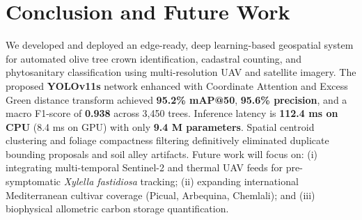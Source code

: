 \documentclass[5p,times]{elsarticle}
\begin{document}
\section{Conclusion and Future Work}
We developed and deployed an edge-ready, deep learning-based geospatial system for automated olive tree crown identification, cadastral counting, and phytosanitary classification using multi-resolution UAV and satellite imagery. The proposed \textbf{YOLOv11s} network enhanced with Coordinate Attention and Excess Green distance transform achieved \textbf{95.2\% mAP@50}, \textbf{95.6\% precision}, and a macro F1-score of \textbf{0.938} across 3,450 trees. Inference latency is \textbf{112.4 ms on CPU} (8.4 ms on GPU) with only \textbf{9.4 M parameters}. Spatial centroid clustering and foliage compactness filtering definitively eliminated duplicate bounding proposals and soil alley artifacts. Future work will focus on: (i) integrating multi-temporal Sentinel-2 and thermal UAV feeds for pre-symptomatic \textit{Xylella fastidiosa} tracking; (ii) expanding international Mediterranean cultivar coverage (Picual, Arbequina, Chemlali); and (iii) biophysical allometric carbon storage quantification.



\end{document}
